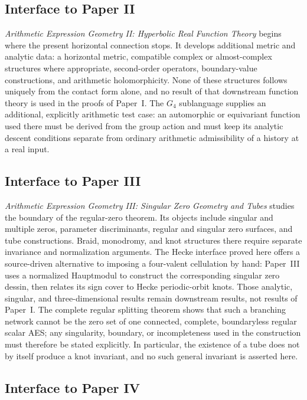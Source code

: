 \subsection{Interface to Paper II}

\emph{Arithmetic Expression Geometry II: Hyperbolic Real Function Theory}
begins where the present horizontal connection stops.  It develops additional
metric and analytic data: a horizontal metric,
compatible complex or almost-complex structures where appropriate,
second-order operators, boundary-value constructions, and arithmetic
holomorphicity.  None of these structures follows uniquely from the contact
form alone, and no result of that downstream function theory is used in the
proofs of Paper~I\cite{Yuan2026AEGFunctionTheory}.  The $G_4$ sublanguage
supplies an additional, explicitly arithmetic test case: an automorphic or
equivariant function used there must be
derived from the group action and must keep its analytic descent conditions
separate from ordinary arithmetic admissibility of a history at a real input.

\subsection{Interface to Paper III}

\emph{Arithmetic Expression Geometry III: Singular Zero Geometry and Tubes}
studies the boundary of the regular-zero theorem.  Its objects include singular
and multiple zeros, parameter discriminants, regular and singular zero surfaces,
and tube constructions.  Braid, monodromy, and knot structures there require
separate invariance and normalization arguments.
The Hecke interface proved here offers a source-driven alternative to imposing
a four-valent cellulation by hand: Paper~III uses a normalized Hauptmodul to
construct the corresponding singular zero dessin, then relates its sign cover
to Hecke periodic-orbit knots\cite{Yuan2026AEGZeroGeometry}.  Those analytic,
singular, and three-dimensional results remain downstream results, not results of
Paper~I.  The complete regular
splitting theorem shows that such a branching network cannot be the zero set of
one connected, complete, boundaryless regular scalar AES; any singularity,
boundary, or incompleteness used in the construction must therefore be stated
explicitly.
In particular, the existence of a tube does not by itself produce a knot
invariant, and no such general invariant is asserted here.

\subsection{Interface to Paper IV}

